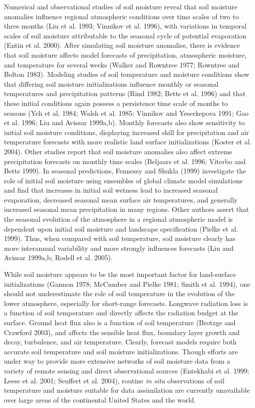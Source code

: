 \documentclass[twocolumn]{article}
\begin{document}
Numerical and observational studies of soil moisture reveal that soil moisture anomalies influence regional atmospheric conditions over time scales of two to three months (Liu et al. 1993; Vinnikov et al. 1996), with variations in temporal scales of soil moisture attributable to the seasonal cycle of potential evaporation (Entin et al. 2000).  After simulating soil moisture anomalies, there is evidence that soil moisture affects model forecasts of precipitation, atmospheric moisture, and temperature for several weeks (Walker and Rowntree 1977; Rowntree and Bolton 1983).  Modeling studies of soil temperature and moisture conditions show that differing soil moisture initializations influence monthly or seasonal temperatures and precipitation patterns (Rind 1982; Betts et al. 1996) and that these initial conditions again possess a persistence time scale of months to seasons (Yeh et al. 1984; Walsh et al. 1985; Vinnikov and Yeserkepova 1991; Gao et al. 1996; Liu and Avissar 1999a,b).  Monthly forecasts also show sensitivity to initial soil moisture conditions, displaying increased skill for precipitation and air temperature forecasts with more realistic land surface initializations (Koster et al. 2004).  Other studies report that soil moisture anomalies also affect extreme precipitation forecasts on monthly time scales (Beljaars et al. 1996; Viterbo and Betts 1999).  In seasonal predictions, Fennessy and Shukla (1999) investigate the role of initial soil moisture using ensembles of global climate model simulations and find that increases in initial soil wetness lead to increased seasonal evaporation, decreased seasonal mean surface air temperatures, and generally increased seasonal mean precipitation in many regions.  Other authors assert that the seasonal evolution of the atmosphere in a regional atmospheric model is dependent upon initial soil moisture and landscape specification (Pielke et al. 1999).  Thus, when compared with soil temperature, soil moisture clearly has more interannual variability and more strongly influences forecasts (Liu and Avissar 1999a,b; Rodell et al. 2005).

While soil moisture appears to be the most important factor for land-surface initializations (Gannon 1978; McCumber and Pielke 1981; Smith et al. 1994), one should not underestimate the role of soil temperature in the evolution of the lower atmosphere, especially for short-range forecasts.  Longwave radiation loss is a function of soil temperature and directly affects the radiation budget at the surface.  Ground heat flux also is a function of soil temperature (Brotzge and Crawford 2003), and affects the sensible heat flux, boundary layer growth and decay, turbulence, and air temperature.  Clearly, forecast models require both accurate soil temperature and soil moisture initializations.  Though efforts are under way to provide more extensive networks of soil moisture data from a variety of remote sensing and direct observational sources (Entekhabi et al. 1999; Leese et al. 2001; Seuffert et al. 2004), routine \textit{in situ} observations of soil temperature and moisture suitable for data assimilation are currently unavailable over large areas of the continental United States and the world.
\end{document}
